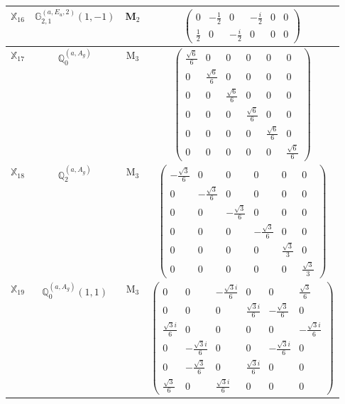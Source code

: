 \documentclass[fleqn,10pt,landscape]{article}
\begin{document}
\begin{itemize}
\begin{center}
\begin{longtable}{c|c|c|c}
$ \mathbb{X}_{16} $ & $\mathbb{G}_{2,1}^{(a,E_{u},2)}(1,-1)$ & M$_{2}$ & $\begin{pmatrix} 0 & - \frac{1}{2} & 0 & - \frac{i}{2} & 0 & 0 \\ \frac{1}{2} & 0 & - \frac{i}{2} & 0 & 0 & 0 \end{pmatrix}$ \\ \hline
$ \mathbb{X}_{17} $ & $\mathbb{Q}_{0}^{(a,A_{g})}$ & M$_{3}$ & $\begin{pmatrix} \frac{\sqrt{6}}{6} & 0 & 0 & 0 & 0 & 0 \\ 0 & \frac{\sqrt{6}}{6} & 0 & 0 & 0 & 0 \\ 0 & 0 & \frac{\sqrt{6}}{6} & 0 & 0 & 0 \\ 0 & 0 & 0 & \frac{\sqrt{6}}{6} & 0 & 0 \\ 0 & 0 & 0 & 0 & \frac{\sqrt{6}}{6} & 0 \\ 0 & 0 & 0 & 0 & 0 & \frac{\sqrt{6}}{6} \end{pmatrix}$ \\
$ \mathbb{X}_{18} $ & $\mathbb{Q}_{2}^{(a,A_{g})}$ & M$_{3}$ & $\begin{pmatrix} - \frac{\sqrt{3}}{6} & 0 & 0 & 0 & 0 & 0 \\ 0 & - \frac{\sqrt{3}}{6} & 0 & 0 & 0 & 0 \\ 0 & 0 & - \frac{\sqrt{3}}{6} & 0 & 0 & 0 \\ 0 & 0 & 0 & - \frac{\sqrt{3}}{6} & 0 & 0 \\ 0 & 0 & 0 & 0 & \frac{\sqrt{3}}{3} & 0 \\ 0 & 0 & 0 & 0 & 0 & \frac{\sqrt{3}}{3} \end{pmatrix}$ \\
$ \mathbb{X}_{19} $ & $\mathbb{Q}_{0}^{(a,A_{g})}(1,1)$ & M$_{3}$ & $\begin{pmatrix} 0 & 0 & - \frac{\sqrt{3} i}{6} & 0 & 0 & \frac{\sqrt{3}}{6} \\ 0 & 0 & 0 & \frac{\sqrt{3} i}{6} & - \frac{\sqrt{3}}{6} & 0 \\ \frac{\sqrt{3} i}{6} & 0 & 0 & 0 & 0 & - \frac{\sqrt{3} i}{6} \\ 0 & - \frac{\sqrt{3} i}{6} & 0 & 0 & - \frac{\sqrt{3} i}{6} & 0 \\ 0 & - \frac{\sqrt{3}}{6} & 0 & \frac{\sqrt{3} i}{6} & 0 & 0 \\ \frac{\sqrt{3}}{6} & 0 & \frac{\sqrt{3} i}{6} & 0 & 0 & 0 \end{pmatrix}$ \\

\end{longtable}
\end{center}
\end{itemize}
\end{document}
